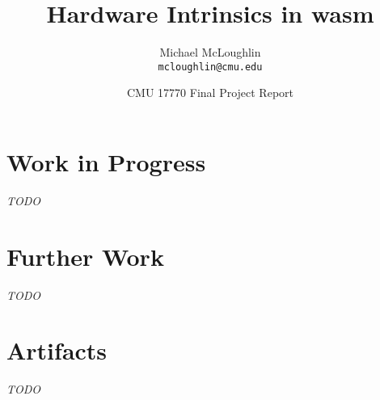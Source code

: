 \documentclass{article}
\newcommand{\wasml}{\acl{wasm}\xspace}
\begin{document}
\title{Hardware Intrinsics in \wasml}
\author{Michael McLoughlin \\ \texttt{mcloughlin@cmu.edu}}
\date{CMU 17770 Final Project Report}
\maketitle

\tableofcontents







\section{Work in Progress}
\emph{TODO}

\section{Further Work}
\label{sec:future}
\emph{TODO}




\appendix

\section{Artifacts}
\emph{TODO}

\printbibliography
\end{document}
